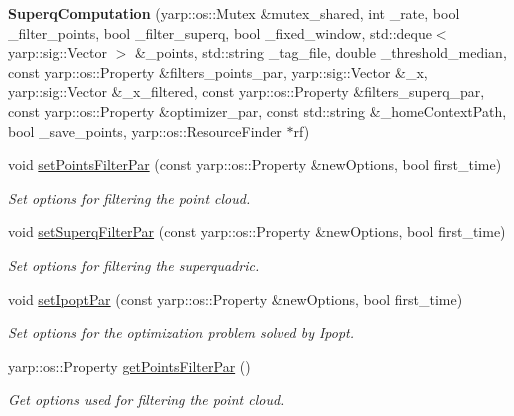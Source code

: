 \begin{DoxyCompactItemize}
\item 
\mbox{\label{classSuperqComputation_a9ded9044e1c7fe17a70997f27eea7aa7}} 
{\bfseries Superq\+Computation} (yarp\+::os\+::\+Mutex \&mutex\+\_\+shared, int \+\_\+rate, bool \+\_\+filter\+\_\+points, bool \+\_\+filter\+\_\+superq, bool \+\_\+fixed\+\_\+window, std\+::deque$<$ yarp\+::sig\+::\+Vector $>$ \&\+\_\+points, std\+::string \+\_\+tag\+\_\+file, double \+\_\+threshold\+\_\+median, const yarp\+::os\+::\+Property \&filters\+\_\+points\+\_\+par, yarp\+::sig\+::\+Vector \&\+\_\+x, yarp\+::sig\+::\+Vector \&\+\_\+x\+\_\+filtered, const yarp\+::os\+::\+Property \&filters\+\_\+superq\+\_\+par, const yarp\+::os\+::\+Property \&optimizer\+\_\+par, const std\+::string \&\+\_\+home\+Context\+Path, bool \+\_\+save\+\_\+points, yarp\+::os\+::\+Resource\+Finder $\ast$rf)
\item 
void \mbox{\hyperlink{classSuperqComputation_a4f841a006336a06d0a349f8a57707524}{set\+Points\+Filter\+Par}} (const yarp\+::os\+::\+Property \&new\+Options, bool first\+\_\+time)
\begin{DoxyCompactList}\small\item\em Set options for filtering the point cloud. \end{DoxyCompactList}\item 
void \mbox{\hyperlink{classSuperqComputation_ac0eb6516ba435573f74b03ed4177d8d0}{set\+Superq\+Filter\+Par}} (const yarp\+::os\+::\+Property \&new\+Options, bool first\+\_\+time)
\begin{DoxyCompactList}\small\item\em Set options for filtering the superquadric. \end{DoxyCompactList}\item 
void \mbox{\hyperlink{classSuperqComputation_afa65ce67fb294f38c4e843540f96de3c}{set\+Ipopt\+Par}} (const yarp\+::os\+::\+Property \&new\+Options, bool first\+\_\+time)
\begin{DoxyCompactList}\small\item\em Set options for the optimization problem solved by Ipopt. \end{DoxyCompactList}\item 
yarp\+::os\+::\+Property \mbox{\hyperlink{classSuperqComputation_a110d429be796961d8c4fe8ce9b944362}{get\+Points\+Filter\+Par}} ()
\begin{DoxyCompactList}\small\item\em Get options used for filtering the point cloud. \end{DoxyCompactList}\item 

\end{DoxyCompactItemize}
